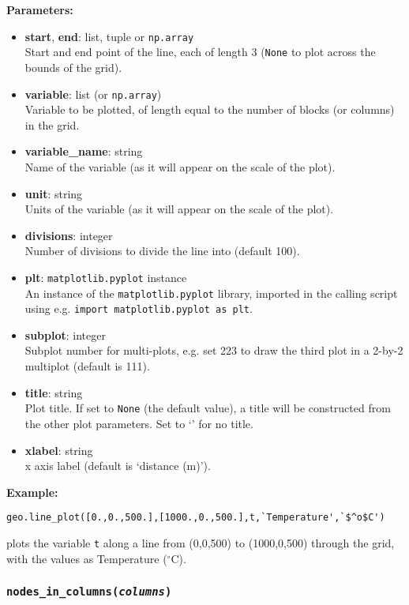 \textbf{Parameters:}
\begin{itemize}
\item \textbf{start}, \textbf{end}: list, tuple or \texttt{np.array}\\
  Start and end point of the line, each of length 3 (\texttt{None} to plot across the bounds of the grid).
\item \textbf{variable}: list (or \texttt{np.array})\\
  Variable to be plotted, of length equal to the number of blocks (or columns) in the grid.
\item \textbf{variable\_name}: string\\
  Name of the variable (as it will appear on the scale of the plot).
\item \textbf{unit}: string\\
  Units of the variable (as it will appear on the scale of the plot).
\item \textbf{divisions}: integer\\
  Number of divisions to divide the line into (default 100).
\item \textbf{plt}: \texttt{matplotlib.pyplot} instance\\
  An instance of the \texttt{matplotlib.pyplot} library, imported in the calling script using e.g. \texttt{import matplotlib.pyplot as plt}.
\item \textbf{subplot}: integer\\
  Subplot number for multi-plots, e.g. set 223 to draw the third plot in a 2-by-2 multiplot (default is 111).
\item \textbf{title}: string\\
  Plot title.  If set to \texttt{None} (the default value), a title will be constructed from the other plot parameters.  Set to `' for no title.
\item \textbf{xlabel}: string\\
  x axis label (default is `distance (m)').
\end{itemize}

\textbf{Example:}

\begin{verbatim}
geo.line_plot([0.,0.,500.],[1000.,0.,500.],t,`Temperature',`$^o$C')
\end{verbatim}

plots the variable \texttt{t} along a line from (0,0,500) to (1000,0,500) through the grid, with the values as Temperature ($^{\circ}$C).

\subsubsection{\texttt{nodes\_in\_columns(\emph{columns})}}
\label{sec:nodes_in_columns}

